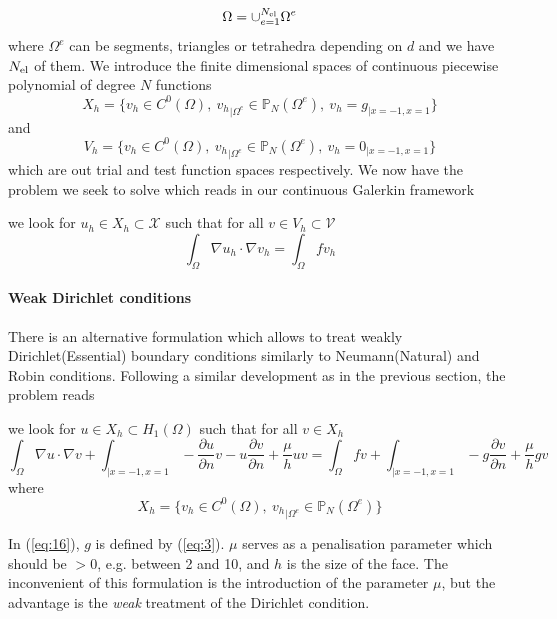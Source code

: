 \begin{equation}
  \label{eq:10}
  \Omega = \cup_{e=1}^{N_{\text{el}}} \Omega^e
\end{equation}
where $\Omega^e$ can be segments, triangles or tetrahedra depending on
$d$ and we have ${N_{\text{el}}}$ of them. We introduce the finite dimensional
spaces of continuous piecewise polynomial of degree $N$ functions
\begin{equation}
  \label{eq:17}
  X_h = \Big\{ v_h  \in C^0(\Omega),\ {v_h}_{|\Omega^e} \in \mathbb{P}_N( \Omega^e ),\   v_h=g_{|x=-1,x=1}\Big\}
\end{equation}
and
\begin{equation}
  \label{eq:18}
  V_h = \Big\{ v_h \in C^0(\Omega),\ {v_h}_{|\Omega^e} \in \mathbb{P}_N( \Omega^e ),\   v_h=0_{|x=-1,x=1}\Big\}
\end{equation}
which are out trial and test function spaces respectively.  We now
have the problem we seek to solve which reads in our continuous
Galerkin framework
\begin{problem}
  \label{prob:2}
  we look for $u_h \in X_h \subset \mathcal{X}$ such that for all $v
  \in V_h \subset \mathcal{V}$
  \begin{equation}
    \label{eq:20}
    \int_\Omega \nabla u_h \cdot \nabla v_h  = \int_\Omega f v_h
  \end{equation}
\end{problem}

\paragraph{Weak Dirichlet conditions}
\label{sec:weak-dirichl-cond}

There is an alternative formulation which allows to treat weakly
Dirichlet(Essential) boundary conditions similarly to Neumann(Natural)
and Robin conditions. Following a similar development as in the previous section, the problem reads
\begin{problem}
  \label{prob:3}
  we look for $u \in X_h \subset H_1(\Omega)$ such that for all $v \in
  X_h$
\begin{equation}
  \label{eq:16}
  \int_\Omega \nabla u \cdot \nabla v +
  \int_{|x=-1,x=1} -\frac{\partial u}{\partial n} v - u \frac{\partial v}{\partial n} + \frac{\mu}{h} u v
  =
  \int_\Omega f v +
  \int_{|x=-1,x=1}  - g \frac{\partial v}{\partial n} + \frac{\mu}{h} g v
\end{equation}
where
\begin{equation}
  \label{eq:19}
  X_h = \Big\{ v_h \in C^0(\Omega),\ {v_h}_{|\Omega^e} \in \mathbb{P}_N( \Omega^e ) \Big\}
\end{equation}
\end{problem}
In (\ref{eq:16}), $g$ is defined by (\ref{eq:3}). $\mu$ serves as a penalisation
parameter which should be $> 0$, e.g. between 2 and 10, and $h$ is the
size of the face. The inconvenient of this formulation is the
introduction of the parameter $\mu$, but the advantage is the
\emph{weak} treatment of the Dirichlet condition.

